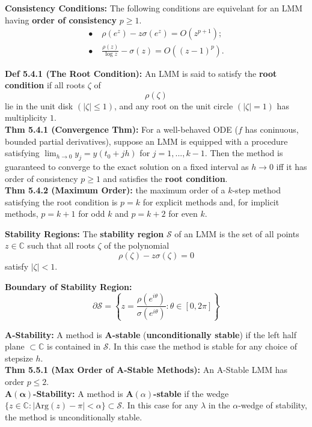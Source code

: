 \documentclass[10pt,a4paper]{article}
\newcommand{\C}{\mathbb{C}}
\newcommand{\del}{\partial}
\newcommand{\bul}{\bullet}
\begin{document}
\begin{multicols*}{2}
\textbf{Consistency Conditions:} The following conditions are equivelant for an LMM having \textbf{order of consistency} $p \geq 1$.
\begin{align*}
    \bul& \; \rho(e^z) - z\sigma(e^z) = O(z^{p + 1});\\
    \bul& \; \frac{\rho(z)}{\log z} - \sigma(z) = O((z - 1)^p).
\end{align*}

\textbf{Def 5.4.1 (The Root Condition):} An LMM is said to satisfy the \textbf{root condition} if all roots $\zeta$ of 
\[
\rho(\zeta)    
\]
lie in the unit disk $(|\zeta| \leq 1)$, and any root on the unit circle $(|\zeta| = 1)$ has multiplicity $1$.\\

\textbf{Thm 5.4.1 (Convergence Thm):} For a well-behaved ODE ($f$ has coninuous, bounded partial derivatives), suppose an LMM is equipped with a procedure satisfying $\lim_{h \to 0} y_j = y(t_0 + jh)$ for $j = 1,...,k - 1$. Then the method is guaranteed
to converge to the exact solution on a fixed interval as $h \to 0$ iff it has order of consistency $p \geq 1$ and satisfies the \textbf{root condition}.\\

\textbf{Thm 5.4.2 (Maximum Order):} the maximum order of a $k$-step method satisfying the root condition is $p = k$ for explicit methods and, for implicit methods, $p = k + 1$ for odd $k$ and $p = k + 2$ for even $k$.

\textbf{Stability Regions:} The \textbf{stability region} $\mathcal S$ of an LMM is the set of all points $z \in \C$ such that all roots $\zeta$ of the polynomial
\[
\rho(\zeta) - z\sigma(\zeta) = 0    
\]
satisfy $|\zeta| < 1$.

\textbf{Boundary of Stability Region:}
\[
\del \mathcal S = \left\{z = \frac{\rho(e^{i\theta})}{\sigma(e^{i\theta})} : \theta \in [0,2\pi]\right\}    
\]

\textbf{A-Stability:} A method is \textbf{A-stable} (\textbf{unconditionally stable}) if the left half plane $\subset \C$ is contained in $\mathcal S$. In this case the method is stable for any choice of stepsize $h$.\\

\textbf{Thm 5.5.1 (Max Order of A-Stable Methods):} An A-Stable LMM has order $p \leq 2$.\\

\textbf{A$(\mathbf \alpha)$-Stability:} A method is \textbf{A$(\alpha)$-stable} if the wedge $\{z \in \C : |\text{Arg}(z) - \pi| < \alpha \} \subset \mathcal S$. In this case for any $\lambda$ in the $\alpha$-wedge of stability, the method is unconditionally stable.


\end{multicols*}
\end{document}
